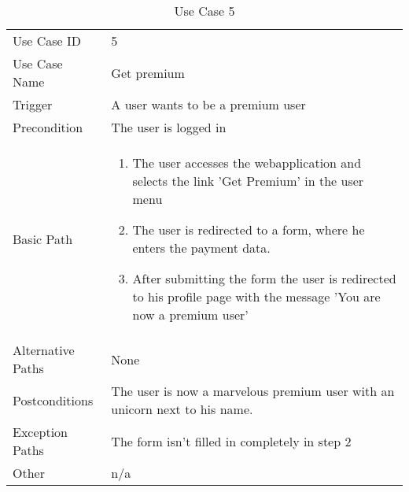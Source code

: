 \begin{table}[H]
\centering
\label{table-use-case-5}
\begin{tabular}{|p{3cm}|p{10cm}}
Use Case ID       & 5                                                         \\
Use Case Name     & Get premium                                \\
Trigger           & A user wants to be a premium user					\\
Precondition      & The user is logged in\\
Basic Path        & \begin{enumerate}
\item The user accesses the webapplication and selects the link 'Get Premium' in the user menu
\item The user is redirected to a form, where he enters the payment data.
\item After submitting the form the user is redirected to his profile page with the message 'You are now a premium user'
\end{enumerate} 
     \\
Alternative Paths & None                          \\
Postconditions    & The user is now a marvelous premium user with an unicorn next to his name.                                                          
\\
Exception Paths   & The form isn't filled in completely in step 2            \\
Other             & n/a                                                                                                                                                                                                        
\end{tabular}
\caption{Use Case 5}
\end{table}

